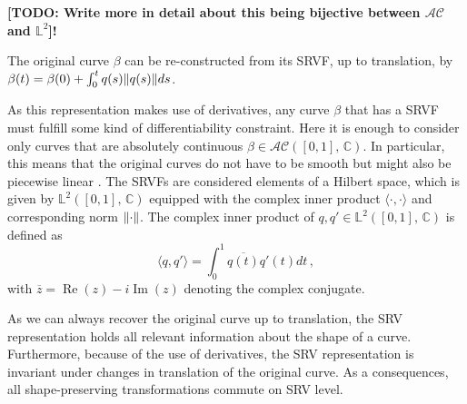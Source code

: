 \textbf{[TODO: Write more in detail about this being bijective between $\mathcal{AC}$ and $\mathbb{L}^2$]!}
\begin{remark}
The original curve $\beta$ can be re-constructed from its SRVF, up to translation, by $\beta(t) = \beta(0) + \int_0^t q(s) \lVert q(s)\rVert ds$.
\end{remark}
As this representation makes use of derivatives, any curve $\beta$ that has a SRVF must fulfill some kind of differentiability constraint.
Here it is enough to consider only curves that are absolutely continuous $\beta \in \mathcal{AC}([0,1],\, \mathbb{C})$.
In particular, this means that the original curves do not have to be smooth but might also be piecewise linear \parencite[see][91]{SrivastavaKlassen2016}.
The SRVFs are considered elements of a Hilbert space, which is given by $\mathbb{L}^2([0,1],\,\mathbb{C})$ equipped with the complex inner product $\langle \cdot, \cdot \rangle$ and corresponding norm $\lVert\cdot\rVert$.
The complex inner product of $q,q' \in \mathbb{L}^2([0,1],\,\mathbb{C})$ is defined as
$$ \langle q, q' \rangle = \int_0^1 \overline{q(t)} q'(t) dt \,, $$
with $\overline{z} = \operatorname{Re}(z) - i \operatorname{Im}(z)$ denoting the complex conjugate.

As we can always recover the original curve up to translation, the SRV representation holds all relevant information about the shape of a curve.
Furthermore, because of the use of derivatives, the SRV representation is invariant under changes in translation of the original curve.
As a consequences, all shape-preserving transformations commute on SRV level.

